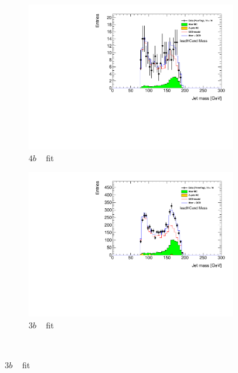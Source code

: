 \begin{figure}[htbp!]
  \centering
  \captionsetup{justification=centering}
    \hspace{-4cm}
    \begin{subfigure}[b]{0.3\textwidth}
        \includegraphics[width=\textwidth,angle=-90]{figures/boosted/Fit/fitNorm_i4.pdf}
        \caption{$4b$ \mleadJ~ fit}
        \label{fig:ttbar-fit-4b}
    \end{subfigure}
    \quad \quad \quad \quad \quad
    \begin{subfigure}[b]{0.3\textwidth}
        \includegraphics[width=\textwidth,angle=-90]{figures/boosted/Fit/fitNorm_i3.pdf}
        \caption{$3b$ \mleadJ~ fit}
        \label{fig:ttbar-fit-3b}
    \end{subfigure}
    \\

\end{figure}
